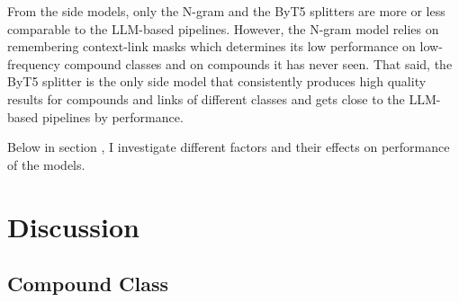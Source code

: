 \documentclass[11pt]{article}
\begin{document}
From the side models, only the N-gram and the ByT5 splitters are more or less comparable to the LLM-based pipelines. However, the N-gram model relies on remembering context-link masks which determines its low performance on low-frequency compound classes and on compounds it has never seen. That said, the ByT5 splitter is the only side model that consistently produces high quality results for compounds and links of different classes and gets close to the LLM-based pipelines by performance.

Below in section , I investigate different factors and their effects on performance of the models.


\section{Discussion}
\label{sec:disc}

\subsection{Compound Class}
\end{document}
